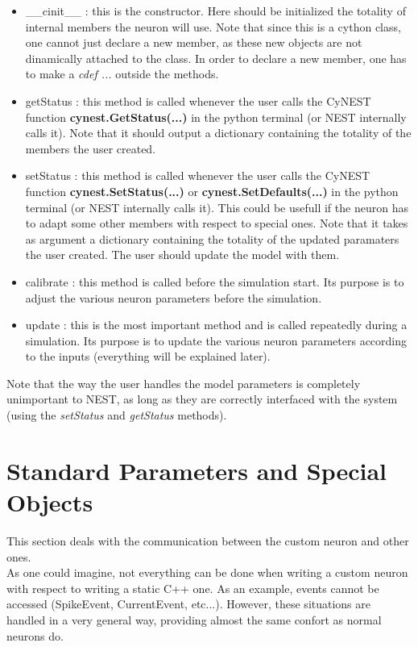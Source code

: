 \documentclass{article}
\begin{document}
\begin{itemize}
\item \_\_cinit\_\_ : this is the constructor. Here should be initialized the totality of internal members the neuron will use. Note that since this is a cython class, one cannot just declare a new member, as these new objects are not dinamically attached to the class. In order to declare a new member, one has to make a \emph{cdef ...} outside the methods. 
\item getStatus : this method is called whenever the user calls the CyNEST function \textbf{ cynest.GetStatus(...)} in the python terminal (or NEST internally calls it). Note that it should output a dictionary containing the totality of the members the user created.
\item setStatus : this method is called whenever the user calls the CyNEST function \textbf{ cynest.SetStatus(...)} or \textbf{cynest.SetDefaults(...)} in the python terminal (or NEST internally calls it). This could be usefull if the neuron has to adapt some other members with respect to special ones. Note that it takes as argument a dictionary containing the totality of the updated paramaters the user created. The user should update the model with them.
\item calibrate : this method is called before the simulation start. Its purpose is to adjust the various neuron parameters before the simulation.
\item update : this is the most important method and is called repeatedly during a simulation. Its purpose is to update the various neuron parameters according to the inputs (everything will be explained later).
\end{itemize}
Note that the way the user handles the model parameters is completely unimportant to NEST, as long as they are correctly interfaced with the system (using the \emph{setStatus} and \emph{getStatus} methods).



\section{Standard Parameters and Special Objects}
This section deals with the communication between the custom neuron and other ones.\\
As one could imagine, not everything can be done when writing a custom neuron with respect to writing a static C++ one. As an example, events cannot be accessed (SpikeEvent, CurrentEvent, etc...). However, these situations are handled in a very general way, providing almost the same confort as normal neurons do.
\end{document}
